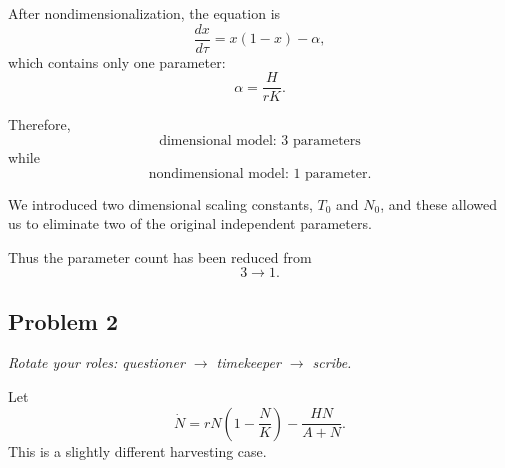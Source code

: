 \documentclass[12pt]{amsart}
\theoremstyle{conjecture}
\theoremstyle{definition}
\theoremstyle{question}
\theoremstyle{theorem}
\begin{document}
\begin{enumerate}[label=(\alph*)]
        After nondimensionalization, the equation is
        \[
            \frac{dx}{d\tau}
            =
            x(1-x)-\alpha,
        \]
        which contains only one parameter:
        \[
            \alpha=\frac{H}{rK}.
        \]

        Therefore,
        \[
            \boxed{
                \text{dimensional model: 3 parameters}
            }
        \]
        while
        \[
            \boxed{
                \text{nondimensional model: 1 parameter}.
            }
        \]

        We introduced two dimensional scaling constants, \(T_0\) and \(N_0\),
        and these allowed us to eliminate two of the original independent
        parameters.

        Thus the parameter count has been reduced from
        \[
            \boxed{3\longrightarrow 1}.
        \]

    \end{enumerate}


    \newpage


    \subsection*{Problem 2}

    \textit{Rotate your roles: questioner \(\rightarrow\) timekeeper
        \(\rightarrow\) scribe.}

    Let
    \[
        \dot N
        =
        rN\left(1-\frac{N}{K}\right)
        -
        \frac{HN}{A+N}.
    \]
    This is a slightly different harvesting case.
\end{document}
